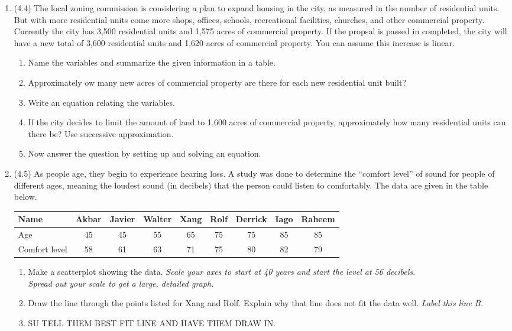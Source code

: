 \documentclass[12pt]{article}
\begin{document}
\begin{enumerate}
\item (4.4) The local zoning commission is considering a plan to expand housing in the city, as measured in the number of residential units.  But with more residential units come more shops, offices, schools, recreational facilities, churches, and other commercial property. Currently the city has 3,500 residential units and 1,575 acres of commercial property.  If the propsal is passed in completed, the city will have a new total of 3,600 residential units and 1,620 acres of commercial property.  You can assume this increase is linear.
\begin{enumerate}
\item Name the variables and summarize the given information in a table.
\item Approximately ow many new acres of commercial property are there for each new residential unit built?
\item Write an equation relating the variables.
\item If the city decides to limit the amount of land to 1,600 acres of commercial property, approximately how many residential units can there be?  Use successive approximation. 
\item Now answer the question by setting up and solving an equation.
\end{enumerate}

\item (4.5) As people age, they begin to experience hearing loss.  A study was done to determine the ``comfort level'' of sound for people of different ages, meaning the loudest sound (in decibels) that the person could listen to comfortably.  The data are given in the table below.
\begin{center}
\begin{tabular} {|l |c |c |c |c |c |c |c |c |} \hline
Name & Akbar & Javier & Walter & Xang & Rolf & Derrick & Iago &Raheem \\ \hline
Age & 45 & 45 & 55 & 65 & 75 & 75 & 85 & 85\\ \hline
Comfort level & 58 & 61 & 63 & 71 & 75 & 80 & 82 & 79 \\ \hline
\end{tabular}
\end{center}
\begin{enumerate}
\item Make a scatterplot showing the data.  
\emph{Scale your axes to start at 40 years and start the level at 56 decibels.  \\ Spread out your scale to get a large, detailed graph.}
\item  Draw the line through the points listed for Xang and Rolf.  Explain why that line does not fit the data well.  \emph{Label this line B.}
\item  SU TELL THEM BEST FIT LINE AND HAVE THEM DRAW IN.
\end{enumerate}



\end{enumerate}
\end{document}
